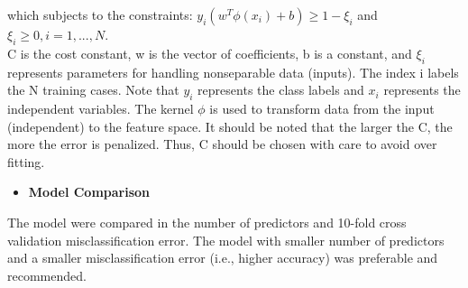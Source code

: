 \documentclass[11pt]{article}
\begin{document}
which subjects to the constraints: $y_i(w^T\phi(x_i)+b) \geq 1-\xi_i$ and $\xi_i \geq0, i = 1,...,N$. \vspace{1.5ex}\\
C is the cost constant, w is the vector of coefficients, b is a constant, and $\xi_i$ represents parameters for handling nonseparable data (inputs). The index i labels the N training cases. Note that $y_i$ represents the class labels and $x_i$ represents the independent variables. The kernel $\phi$  is used to transform data from the input (independent) to the feature space. It should be noted that the larger the C, the more the error is penalized. Thus, C should be chosen with care to avoid over fitting.
\begin{itemize}
\item{\bf Model Comparison}
\end{itemize}
The model were compared in the number of predictors and 10-fold cross validation misclassification error. The model with smaller number of predictors and a smaller misclassification error (i.e., higher accuracy) was preferable and recommended. 
\vspace{2ex}\\
\end{document}
